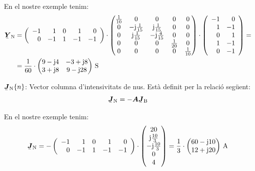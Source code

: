 \begin{list}{}
   En el nostre exemple tenim:
   \[ \begin{split}
      \mcmplx{Y}\ped{N} &=
      \left(\begin{array}{rrrrr} -1 & 1  & 0 &  1 & 0 \\  0 & -1 & 1 & -1 & -1
      \end{array}\right) \cdot
      \begin{pmatrix}
            \frac{1}{10} & 0 & 0 & 0 & 0 \\
            0 & -\ju\frac{1}{15} & \ju\frac{1}{15} & 0 & 0 \\
            0 & \ju\frac{1}{15} & -\ju\frac{4}{15} & 0 & 0 \\
            0 & 0 & 0 & \frac{1}{20} & 0 \\
            0 & 0 & 0 & 0 & \frac{1}{10}
      \end{pmatrix} \cdot
      \left(\begin{array}{rr} -1 & 0 \\ 1  & -1 \\  0 & 1 \\ 1 & -1 \\ 0 & -1
      \end{array}\right) = \\
       &=
      \frac{1}{60} \cdot \begin{pmatrix}
            9 - \ju 4 & -3 + \ju 8 \\
            3 + \ju 8 & 9 - \ju 28
      \end{pmatrix}\unit{S}
   \end{split}  \label{eq:yn}
   \]

   \item[$\mcmplx{J}\ped{N}\{n\}$:] Vector columna d'intensivitats de nus. Est\`{a} definit per la relaci\'{o} seg\"{u}ent:
   \begin{equation}
      \mcmplx{J}\ped{N} = - \boldsymbol{A} \mcmplx{J}\ped{B}
   \end{equation}

   En el nostre exemple tenim:
   \[
      \mcmplx{J}\ped{N} = -
      \left(\begin{array}{rrrrr} -1 & 1  & 0 &  1 & 0 \\  0 & -1 & 1 & -1 & -1
      \end{array}\right) \cdot
      \begin{pmatrix} 20 \\ \ju\frac{10}{3} \\ -\ju\frac{10}{3} \\ 0 \\ 4 \end{pmatrix}
      =
      \frac{1}{3} \cdot \begin{pmatrix}
            60 - \ju 10 \\
            12 + \ju 20
      \end{pmatrix}\unit{A}
   \]


\end{list}
